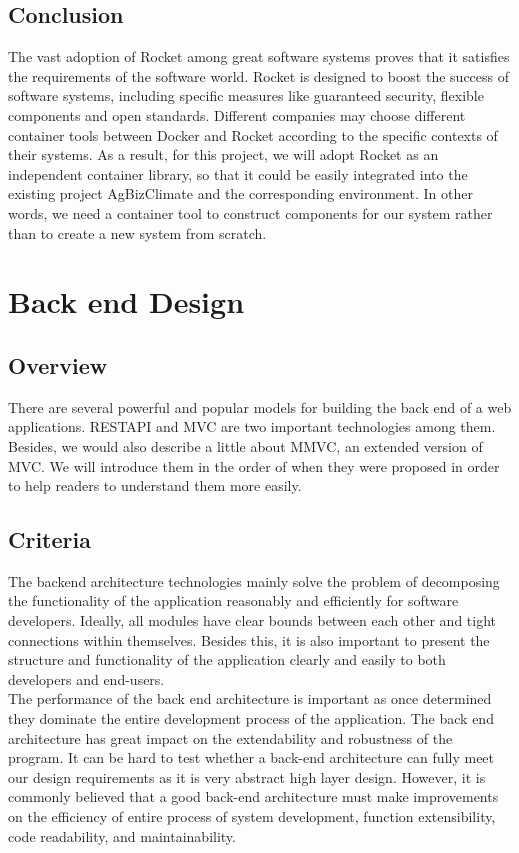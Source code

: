 \documentclass[letterpaper,10pt]{article}
\begin{document}
	\subsection{Conclusion}
  The vast adoption of Rocket among great software systems proves that it satisfies the requirements of the software world. Rocket is designed to boost the success of software systems, including specific measures like guaranteed security, flexible components and open standards. Different companies may choose different container tools between Docker and Rocket according to the specific contexts of their systems.
  As a result, for this project, we will adopt Rocket as an independent container library, so that it could be easily integrated into the existing project AgBizClimate and the corresponding environment. In other words, we need a container tool to construct components for our system rather than to create a new system from scratch.


\section{Back end Design}
	\subsection{Overview}
        There are several powerful and popular models for building the back end of a web applications. RESTAPI and MVC are two important technologies among them. Besides, we would also describe a little about MMVC, an extended version of MVC. We will introduce them in the order of when they were proposed in order to help readers to understand them more easily.

	\subsection{Criteria}
  The backend architecture technologies mainly solve the problem of decomposing the  functionality of the application reasonably and efficiently for software developers. Ideally, all modules have clear bounds between each other and tight connections within themselves. Besides this, it is also important to present the structure and functionality of the application clearly and easily to both developers and end-users.\\
  The performance of the back end architecture is important as once determined they dominate the entire development process of the application. The back end architecture has great impact on the extendability and robustness of the program. It can be hard to test whether a back-end architecture can fully meet our design requirements as it is very abstract high layer design. However, it is commonly believed that a good back-end architecture must make improvements on the efficiency of entire process of system development, function extensibility, code readability, and maintainability.
\end{document}
